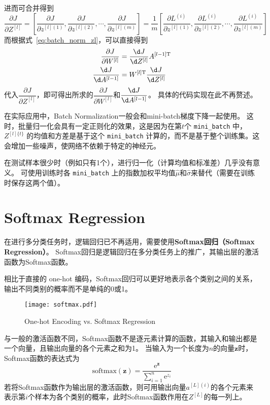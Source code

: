 进而可合并得到
\begin{equation}
    \dfrac{\partial J}{\partial Z^{[l]}} 
    = \left[ \dfrac{\partial J}{\partial z^{[l](1)}}, \dfrac{\partial J}{\partial z^{[l](2)}}, \cdots, \dfrac{\partial J}{\partial z^{[l](m)}} \right]
    = \dfrac{1}{m} \left[ \dfrac{\partial L^{(i)}}{\partial z^{[l](1)}}, \dfrac{\partial L^{(i)}}{\partial z^{[l](2)}}, \cdots, \dfrac{\partial L^{(i)}}{\partial z^{[l](m)}} \right]
\end{equation}
而根据式~\eqref{eq:batch_norm_zl}，可以直接得到
\begin{align}
    \dfrac{\partial J}{\partial W^{[l]}} &= \dfrac{\d J}{\d Z^{[l]}} A^{[l-1] \mathrm{T}} \\
    \dfrac{\d J}{\d A^{[l-1]}} &= W^{[l] \mathrm{T}} \dfrac{\d J}{\d Z^{[l]}}
\end{align}
代入$\dfrac{\partial J}{\partial Z^{[l]}}$，即可得出所求的$\dfrac{\partial J}{\partial W^{[l]}}$和$\dfrac{\d J}{\d A^{[l-1]}}$。
具体的代码实现在此不再赘述。

在实际应用中，Batch Normalization一般会和mini-batch梯度下降一起使用。
这时，批量归一化会具有一定正则化的效果，这是因为在第$t$个 \verb|mini_batch| 中，$Z^{[l]\{t\}}$ 的均值和方差是基于这个 \verb|mini_batch| 计算的，而不是基于整个训练集。这会增加一些噪声，使网络不依赖于特定的神经元。

在测试样本很少时（例如只有1个），进行归一化（计算均值和标准差）几乎没有意义。
可使用训练时各 \verb|mini_batch| 上的指数加权平均值$\hat{\mu}$和$\hat{\sigma}$来替代（需要在训练时保存这两个值）。

\section{Softmax Regression}

在进行多分类任务时，逻辑回归已不再适用，需要使用\textbf{Softmax回归（Softmax Regression）}。
Softmax回归是逻辑回归在多分类任务上的推广，其输出层的激活函数为Softmax函数。

相比于直接的 one-hot 编码，Softmax回归可以更好地表示各个类别之间的关系，输出不同类别的概率而不是单纯的0或1。
\begin{figure}[h!bt]
    \centering
    \texttt{[image: softmax.pdf]}
    \caption{One-hot Encoding vs. Softmax Regression}
\end{figure}

与一般的激活函数不同，Softmax函数不是逐元素计算的函数，其输入和输出都是一个向量，且输出向量的各个元素之和为1。
当输入为一个长度为$n$的向量$\bm{z}$时，Softmax函数的表达式为
\begin{equation}
    \mathrm{softmax}(\bm{z}) = \frac{{\mathrm{e}}^{\bm{z}}}{\sum_{i=1}^n {\mathrm{e}}^{z_i}}
\end{equation}
若将Softmax函数作为输出层的激活函数，则可用输出向量$a^{[L](i)}$的各个元素来表示第$i$个样本为各个类别的概率，此时Softmax函数作用在$Z^{[L]}$的每一列上。

